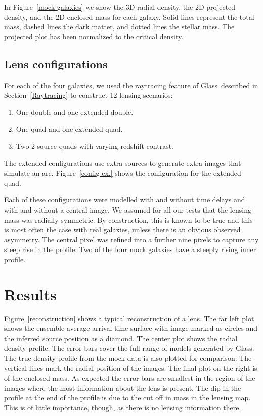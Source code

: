 \documentclass[galley]{mn2e}
\newcommand{\Glass}{{\sc Glass}}
\newcommand{\figref}[1] {Figure~\ref{#1}}
\newcommand{\secref}[1] {Section~\ref{#1}}
\begin{document}
In \figref{mock galaxies} we show the 3D radial density, 
the 2D projected density, and the 2D enclosed mass for each
galaxy. Solid lines represent the total mass, dashed lines the dark 
matter, and dotted lines the stellar mass. The projected plot has
been normalized to the critical density.

\subsection{Lens configurations} %

For each of the four galaxies, we used the raytracing feature of \Glass\
described in \secref{Raytracing} to construct 12 lensing scenarios:

\begin{enumerate}
\item One double and one extended double.
\item One quad and one extended quad.
\item Two 2-source quads with varying redshift contrast.
\end{enumerate}

The extended configurations use extra sources to generate extra images that
simulate an arc. \figref{config ex.} shows the configuration for the extended
quad.

Each of these configurations were modelled with and without time delays and with
and without a central image. We assumed for all our tests that the lensing mass
was radially symmetric. By construction, this is known to be true and this is
most often the case with real galaxies, unless there is an obvious observed
asymmetry. The central pixel was refined into a further nine pixels to capture
any steep rise in the profile. Two of the four mock galaxies have a steeply rising
inner profile.

\section{Results}\label{sec:results}

\figref{reconstruction} shows a typical reconstruction of a
lens. The far left plot shows the ensemble average arrival time surface with
image marked as circles and the inferred source position as a diamond. The
center plot shows the radial density profile. The error bars cover the full
range of models generated by \Glass. The true density profile from the mock
data is also plotted for comparison. The vertical lines mark the radial
position of the images. The final plot on the right is of the enclosed mass. As
expected the error bars are smallest in the region of the images where the most
information about the lens is present. The dip in the profile at the end of the
profile is due to the cut off in mass in the lensing map. This is of little
importance, though, as there is no lensing information there.
\end{document}
